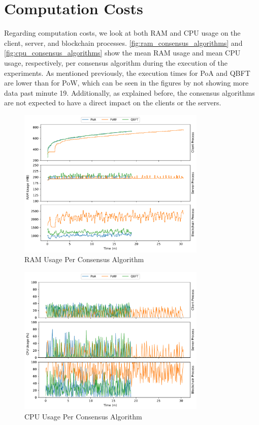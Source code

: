 \section{Computation Costs}

Regarding computation costs, we look at both RAM and CPU usage on the client, server, and blockchain processes. \autoref{fig:ram_consensus_algorithms} and \autoref{fig:cpu_consensus_algorithms} show the mean RAM usage and mean CPU usage, respectively, per consensus algorithm during the execution of the experiments. As mentioned previously, the execution times for PoA and QBFT are lower than for PoW, which can be seen in the figures by not showing more data past minute 19. Additionally, as explained before, the consensus algorithms are not expected to have a direct impact on the clients or the servers.

\begin{figure}[!hpt]
    \centering
    \centering
    \includegraphics[width=0.8\textwidth]{graphics/consensus/ram.pdf}
    \caption{RAM Usage Per Consensus Algorithm}
    \label{fig:ram_consensus_algorithms}
\end{figure}

\begin{figure}[!hpb]
    \centering
    \centering
    \includegraphics[width=0.8\textwidth]{graphics/consensus/cpu.pdf}
    \caption{CPU Usage Per Consensus Algorithm}
    \label{fig:cpu_consensus_algorithms}
\end{figure}

